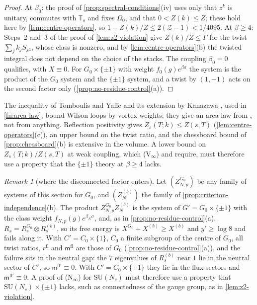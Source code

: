 \documentclass[11pt,a4paper]{amsart}
\theoremstyle{definition}
\theoremstyle{remark}
\newtheorem{remark}[theorem]{Remark}
\numberwithin{equation}{section}
\newcommand{\SU}{\mathrm{SU}}              %
\newcommand{\TT}{\mathbb{T}}               %
\newcommand{\Zpart}[2]{Z(#1,#2)}           %
\newcommand{\Zc}{\mathcal{Z}}              %
\newcommand{\Omegazero}{\Omega_0}          %
\newcommand{\Mcirc}{\text{\upshape(M$^{\circ}$)}}   %
\newcommand{\hypP}{\text{\upshape(P)}}              %
\begin{document}
\begin{proof}
At $\beta_0$: the proof of \cref{prop:spectral-conditions}\textup{(iv)} uses only that $z^k$ is unitary, commutes with $\TT_s$ and fixes $\Omegazero$, and that $0<Z(k)\le Z$; these hold here by \cref{lem:centre-operators}, so $1-Z(k)/Z\le2(\Zc-1)<1/4095$. At $\beta\ge4$: Steps~2 and~3 of the proof of \cref{lem:z2-violation} give $Z(k)/Z\le\Gamma$ for the twist $\sum_jk_jS_{j4}$, whose class is nonzero, and by \cref{lem:centre-operators}\textup{(b)} the twisted integral does not depend on the choice of the stacks. The coupling $\beta_0=0$ qualifies, with $X\equiv0$. For $G_0\times\{\pm1\}$ with weight $f_0(g)e^{\beta\sigma}$ the system is the product of the $G_0$ system and the $\{\pm1\}$ system, and a twist by $(1,-1)$ acts on the second factor only (\cref{prop:no-residue-control}\textup{(a)}).
\end{proof}

The inequality of Tomboulis and Yaffe and its extension by Kanazawa \cite{tomboulis1985,kanazawa2009}, used in \cref{fn:area-law}, bound Wilson loops by vortex weights; they give an area law from \hypP{}, not \hypP{} from anything. Reflection positivity gives $Z_s(T;k)\le\Zpart{s}{T}$ (\cref{lem:centre-operators}\textup{(c)}), an upper bound on the twist ratio, and the chessboard bound of \cref{prop:chessboard}\textup{(b)} is extensive in the volume. A lower bound on $Z_s(T;k)/\Zpart{s}{T}$ at weak coupling, which \textup{(V$_\infty$)} and \hypP{} require, must therefore use a property that the $\{\pm1\}$ theory at $\beta\ge4$ lacks.

\begin{remark}[where the disconnected factor enters]\label{rem:neutral-connectedness}
Let $(Z^{G_0}_{N,p})$ be any family of systems of this section for $G_0$, and $(Z^{(b)}_N)$ the family of \cref{prop:criterion-independence}\textup{(b)}. The product $Z^{G_0}_{N,p}Z^{(b)}_N$ is the system of $G'=G_0\times\{\pm1\}$ with the class weight $f_{N,p}(g)e^{\beta_N\sigma}$, and, as in \cref{prop:no-residue-control}\textup{(a)}, $R_s=R^{G_0}_s\otimes R^{(b)}_s$, so its free energy is $X^{G_0}+X^{(b)}\ge X^{(b)}$ and $y'\ge\log8$ and \Mcirc{} fails along it. With $C'=C_0\times\{1\}$, $C_0$ a finite subgroup of the centre of $G_0$, all twist ratios, $r^{\mathrm{fl}}$ and $\mathsf m^{\mathrm{fl}}$ are those of $G_0$ (\cref{prop:no-residue-control}\textup{(a)}), and the failure sits in the neutral gap: the $7$ eigenvalues of $R^{(b)}_s$ near $1$ lie in the neutral sector of $C'$, so $\mathsf m^{0\prime}\equiv0$. With $C'=C_0\times\{\pm1\}$ they lie in the flux sectors and $\mathsf m^{\mathrm{fl}\prime}\equiv0$. A proof of \textup{(N$_\infty$)} for $\SU(N_c)$ must therefore use a property that $\SU(N_c)\times\{\pm1\}$ lacks, such as connectedness of the gauge group, as in \cref{lem:z2-violation}.
\end{remark}
\end{document}
